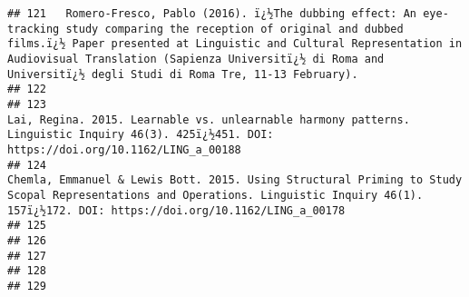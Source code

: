 \documentclass[
  english,
  man]{apa6}
\begin{document}
\begin{verbatim}
## 121   Romero-Fresco, Pablo (2016). ï¿½The dubbing effect: An eye-tracking study comparing the reception of original and dubbed films.ï¿½ Paper presented at Linguistic and Cultural Representation in Audiovisual Translation (Sapienza Universitï¿½ di Roma and Universitï¿½ degli Studi di Roma Tre, 11-13 February).
## 122                                                                                                                                                                                                                                                                                                                    
## 123                                                                                                                                                                       Lai, Regina. 2015. Learnable vs. unlearnable harmony patterns. Linguistic Inquiry 46(3). 425ï¿½451. DOI: https://doi.org/10.1162/LING_a_00188
## 124                                                                                                                        Chemla, Emmanuel & Lewis Bott. 2015. Using Structural Priming to Study Scopal Representations and Operations. Linguistic Inquiry 46(1). 157ï¿½172. DOI: https://doi.org/10.1162/LING_a_00178
## 125                                                                                                                                                                                                                                                                                                                    
## 126                                                                                                                                                                                                                                                                                                                    
## 127                                                                                                                                                                                                                                                                                                                    
## 128                                                                                                                                                                                                                                                                                                                    
## 129                                                                                                                                                                                                                                                                                                                    

\end{verbatim}
\end{document}
